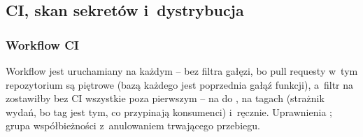 \subsection{CI, skan sekretów i~dystrybucja}\label{sec:standardy-ci}

\subsubsection{Workflow CI}

Workflow  jest uruchamiany na każdym  -- bez filtra gałęzi, bo pull requesty w~tym
repozytorium są piętrowe (bazą każdego jest poprzednia gałąź funkcji), a~filtr na
 zostawiłby bez CI wszystkie poza pierwszym -- na  do
, na tagach  (strażnik wydań, bo tag jest tym, co przypinają
konsumenci) i~ręcznie. Uprawnienia ; grupa współbieżności
 z~anulowaniem trwającego przebiegu.

